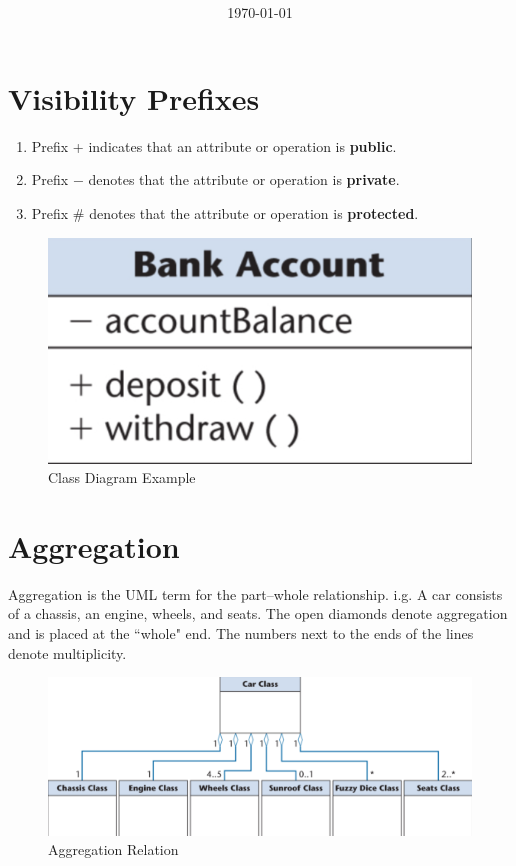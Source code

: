 \documentclass[11pt]{article}
\title{\textbf{\Topic}}
\author{\Name}
\date{\today}
\begin{document}
\maketitle
\noindent\makebox[\linewidth]{\rule[8pt]{5in}{0.5pt}}

\section*{Visibility Prefixes}

\begin{enumerate}
	\item Prefix + indicates that an attribute or operation is \textbf{public}.
	\item Prefix $-$ denotes that the attribute or operation is \textbf{private}.
	\item Prefix \# denotes that the attribute or operation is \textbf{protected}.
\end{enumerate}

\begin{figure}[h]
	\centering
	\includegraphics[width=0.3\linewidth]{images/SingleClass.png}
	\caption{Class Diagram Example}
	\label{fig:SingleClass}
\end{figure}

\section*{Aggregation}

Aggregation is the UML term for the part–whole relationship. i.g. A car consists of a chassis, an engine, wheels, and seats. The open diamonds denote aggregation and is placed at the ``whole" end. The numbers next to the ends of the lines denote multiplicity.

\begin{figure}[h]
	\centering
	\includegraphics[width=0.9\linewidth]{images/Aggregation.png}
	\caption{Aggregation Relation}
	\label{fig:Aggregation}
\end{figure}
\end{document}
